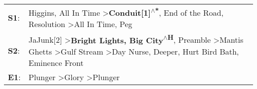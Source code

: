\begin{supertabular}{p{0.03\textwidth}p{0.92\textwidth}}
 \textbf{S1}:  &                                                                                                                            Higgins\textsuperscript{}, \enspace All In Time\textsuperscript{} \textgreater \enspace \textbf{Conduit[1]\textsuperscript{$\wedge$*}}, \enspace End of the Road\textsuperscript{}, \enspace Resolution\textsuperscript{} \textgreater \enspace All In Time\textsuperscript{}, \enspace Peg\textsuperscript{}  \enspace  \\
 \textbf{S2}:  &  JaJunk[2]\textsuperscript{} \textgreater \enspace \textbf{Bright Lights, Big City\textsuperscript{$\wedge$H}}, \enspace Preamble\textsuperscript{} \textgreater \enspace Mantis Ghetts\textsuperscript{} \textgreater \enspace Gulf Stream\textsuperscript{} \textgreater \enspace Day Nurse\textsuperscript{}, \enspace Deeper\textsuperscript{}, \enspace Hurt Bird Bath\textsuperscript{}, \enspace Eminence Front\textsuperscript{}  \enspace  \\
 \textbf{E1}:  &                                                                                                                                                                                                                                                                                                                  Plunger\textsuperscript{} \textgreater \enspace Glory\textsuperscript{} \textgreater \enspace Plunger\textsuperscript{}  \enspace  \\
\end{supertabular}
